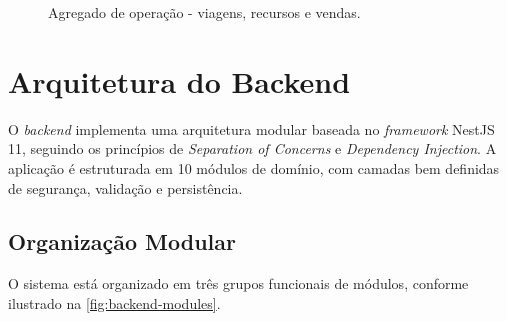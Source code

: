 \begin{figure}[H]
  \caption{Agregado de operação - viagens, recursos e vendas.}
  \label{fig:agregado-operacao-vendas}
\end{figure}

\section{Arquitetura do Backend}

O \textit{backend} implementa uma arquitetura modular baseada no \textit{framework} NestJS 11, seguindo os princípios de \textit{Separation of Concerns} e \textit{Dependency Injection}. A aplicação é estruturada em 10 módulos de domínio, com camadas bem definidas de segurança, validação e persistência.

\subsection{Organização Modular}

O sistema está organizado em três grupos funcionais de módulos, conforme ilustrado na \autoref{fig:backend-modules}.


